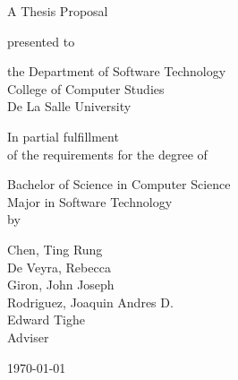 %
%
%                 

\begin{titlepage}
\centering



\vspace{1.5cm}

A Thesis Proposal\\

\vspace{0.5cm}

presented to\\

\vspace{0.5cm}

the Department of Software Technology\\
College of Computer Studies\\
De La Salle University

\vspace{1cm}

In partial fulfillment\\
of the requirements for the degree of\\

\vspace{0.5cm}

Bachelor of Science in Computer Science\\
Major in Software Technology
\vspace{1.75cm}
\\by\\


\vspace{1cm}

Chen, Ting Rung  \\
De Veyra, Rebecca  \\
Giron, John Joseph  \\
Rodriguez, Joaquin Andres D.  \\

\vspace{1.75cm}
Edward Tighe \\
Adviser

\vspace{1.60cm}
\today
\end{titlepage}
